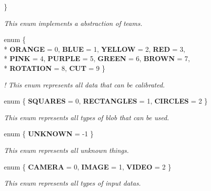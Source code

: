 \begin{DoxyCompactItemize}
 \}\hypertarget{namespacecommon_a9282a476d6b9d03ef99617079881fa46}{}\label{namespacecommon_a9282a476d6b9d03ef99617079881fa46}
\begin{DoxyCompactList}\small\item\em This enum implements a abstraction of teams. \end{DoxyCompactList}
\item 
enum \{ \\*
{\bfseries O\+R\+A\+N\+GE} = 0, 
{\bfseries B\+L\+UE} = 1, 
{\bfseries Y\+E\+L\+L\+OW} = 2, 
{\bfseries R\+ED} = 3, 
\\*
{\bfseries P\+I\+NK} = 4, 
{\bfseries P\+U\+R\+P\+LE} = 5, 
{\bfseries G\+R\+E\+EN} = 6, 
{\bfseries B\+R\+O\+WN} = 7, 
\\*
{\bfseries R\+O\+T\+A\+T\+I\+ON} = 8, 
{\bfseries C\+UT} = 9
 \}\hypertarget{namespacecommon_a8993f678d3732043cfd91d1ecff7aee9}{}\label{namespacecommon_a8993f678d3732043cfd91d1ecff7aee9}
\begin{DoxyCompactList}\small\item\em ! This enum represents all data that can be calibrated. \end{DoxyCompactList}
\item 
enum \{ {\bfseries S\+Q\+U\+A\+R\+ES} = 0, 
{\bfseries R\+E\+C\+T\+A\+N\+G\+L\+ES} = 1, 
{\bfseries C\+I\+R\+C\+L\+ES} = 2
 \}\hypertarget{namespacecommon_a8714be2ce7f79e894ea222f8b6c6192d}{}\label{namespacecommon_a8714be2ce7f79e894ea222f8b6c6192d}
\begin{DoxyCompactList}\small\item\em This enum represents all types of blob that can be used. \end{DoxyCompactList}
\item 
enum \{ {\bfseries U\+N\+K\+N\+O\+WN} = -\/1
 \}\hypertarget{namespacecommon_a778707b5ddd121964dfde87ca9412cdd}{}\label{namespacecommon_a778707b5ddd121964dfde87ca9412cdd}
\begin{DoxyCompactList}\small\item\em This enum represents all unknown things. \end{DoxyCompactList}
\item 
enum \{ {\bfseries C\+A\+M\+E\+RA} = 0, 
{\bfseries I\+M\+A\+GE} = 1, 
{\bfseries V\+I\+D\+EO} = 2
 \}\hypertarget{namespacecommon_aa3ff310c0126c187a017a24df9b33bb0}{}\label{namespacecommon_aa3ff310c0126c187a017a24df9b33bb0}
\begin{DoxyCompactList}\small\item\em This enum represents all types of input datas. \end{DoxyCompactList}

\end{DoxyCompactItemize}
